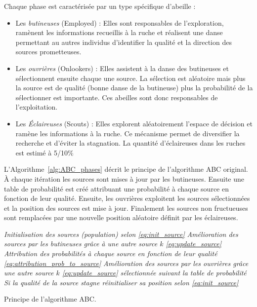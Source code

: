 \noindent Chaque phase est caractérisée par un type spécifique d’abeille :
\begin{itemize}
  \item Les \emph{butineuses} (Employed) : Elles sont responsables de l’exploration,
        ramènent les informations recueillis à la ruche et réalisent une danse
        permettant au autres individus d’identifier la qualité et la direction des
        sources prometteuses.
  \item Les \emph{ouvrières} (Onlookers) : Elles assistent à la danse des butineuses
        et sélectionnent ensuite chaque une source. La sélection est aléatoire mais plus
        la source est de qualité (bonne danse de la butineuse) plus la probabilité
        de la sélectionner est importante. Ces abeilles sont donc responsables de l’exploitation.
  \item Les \emph{Éclaireuses} (Scouts) : Elles explorent aléatoirement l’espace
        de décision et ramène les informations à la ruche. Ce mécanisme
        permet de diversifier la recherche et d’éviter la stagnation. La quantité
        d’éclaireuses dans les ruches est estimé à 5/10\si{\percent} \parencite{Seeley1996}
\end{itemize}

L’Algorithme~\ref{alg:ABC_phases} décrit le principe de l’algorithme ABC original.
À chaque itération les sources sont mises à jour par les butineuses. Ensuite une
table de probabilité est créé attribuant une probabilité à chaque source en fonction
de leur qualité. Ensuite, les ouvrières exploitent les sources sélectionnées et
la position des sources est mise à jour. Finalement les sources non fructueuses sont
remplacées par une nouvelle position aléatoire définit par les éclaireuses.
\begin{algorithm}\label{alg:ABC_phases}
  \SetAlgoVlined
  \emph{Initialisation des sources (population) selon \eqref{eq:init_source}}\;
  {
  {
    \emph{Amélioration des sources par les butineuses grâce à une autre source $k$ \eqref{eq:update_source}}\;
    \emph{Attribution des probabilités à chaque source en fonction de leur qualité
          \eqref{eq:attribution_prob_to_source}}\;
    \emph{Amélioration des sources par les ouvrières grâce une autre source $k$ \eqref{eq:update_source}
          sélectionnée suivant la table de probabilité}\;
    \emph{Si la qualité de la source stagne réinitialiser sa position selon \eqref{eq:init_source}}\;
  }
  }
  \caption{Principe de l’algorithme ABC.}
\end{algorithm}

